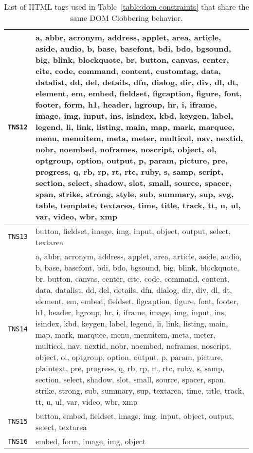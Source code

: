 \begin{table}[!t]
\begin{tabular}{l|p{}}
\midrule
\small \texttt{TNS12} & \tiny {a, abbr, acronym, address, applet, area, article, aside, audio, b, base, basefont, bdi, bdo, bgsound, big, blink, blockquote, br, button, canvas, center, cite, code, command, content, customtag, data, datalist, dd, del, details, dfn, dialog, dir, div, dl, dt, element, em, embed, fieldset, figcaption, figure, font, footer, form, h1, header, hgroup, hr, i, iframe, image, img, input, ins, isindex, kbd, keygen, label, legend, li, link, listing, main, map, mark, marquee, menu, menuitem, meta, meter, multicol, nav, nextid, nobr, noembed, noframes, noscript, object, ol, optgroup, option, output, p, param, picture, pre, progress, q, rb, rp, rt, rtc, ruby, s, samp, script, section, select, shadow, slot, small, source, spacer, span, strike, strong, style, sub, summary, sup, svg, table, template, textarea, time, title, track, tt, u, ul, var, video, wbr, xmp} \\
\midrule
\small \texttt{TNS13} & \tiny {button, fieldset, image, img, input, object, output, select, textarea} \\
\midrule
\small \texttt{TNS14} & \tiny {a, abbr, acronym, address, applet, area, article, aside, audio, b, base, basefont, bdi, bdo, bgsound, big, blink, blockquote, br, button, canvas, center, cite, code, command, content, data, datalist, dd, del, details, dfn, dialog, dir, div, dl, dt, element, em, embed, fieldset, figcaption, figure, font, footer, h1, header, hgroup, hr, i, iframe, image, img, input, ins, isindex, kbd, keygen, label, legend, li, link, listing, main, map, mark, marquee, menu, menuitem, meta, meter, multicol, nav, nextid, nobr, noembed, noframes, noscript, object, ol, optgroup, option, output, p, param, picture, plaintext, pre, progress, q, rb, rp, rt, rtc, ruby, s, samp, section, select, shadow, slot, small, source, spacer, span, strike, strong, sub, summary, sup, textarea, time, title, track, tt, u, ul, var, video, wbr, xmp} \\
\midrule
\small \texttt{TNS15} & \tiny {button, embed, fieldset, image, img, input, object, output, select, textarea} \\
\midrule
\small \texttt{TNS16} & \tiny {embed, form, image, img, object} \\

\bottomrule
\end{tabular}
\begin{flushleft}
\vspace{-5pt}
\vspace{-5pt}
\end{flushleft}
\caption{List of HTML tags used in Table~\ref{table:dom-constraints} that share the same DOM Clobbering behavior.}
\label{appendix:tag-attribute-set}
\end{table}
